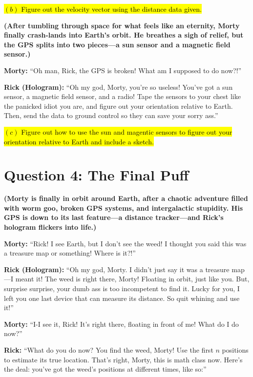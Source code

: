 \documentclass[a4paper, 12pt]{exam}
\begin{document}
\hl{$(b)$ Figure out the velocity vector using the distance data given.} \bigskip

\noindent \textbf{(After tumbling through space for what feels like an eternity, Morty finally crash-lands into Earth’s orbit. He breathes a sigh of relief, but the GPS splits into two pieces—a sun sensor and a magnetic field sensor.)} \bigskip

\noindent \textbf{Morty:} “Oh man, Rick, the GPS is broken! What am I supposed to do now?!” \bigskip

\noindent \textbf{Rick (Hologram):} “Oh my god, Morty, you’re so useless! You’ve got a sun sensor, a magnetic field sensor, and a radio! Tape the sensors to your chest like the panicked idiot you are, and figure out your orientation relative to Earth. Then, send the data to ground control so they can save your sorry ass.”

\bigskip

\hl{$(c)$ Figure out how to use the sun and magentic sensors to figure out your orientation relative to Earth and include a sketch.} \bigskip
	
	
	
\pagebreak
\section*{Question 4: The Final Puff}

\noindent \textbf{(Morty is finally in orbit around Earth, after a chaotic adventure filled with worm goo, broken GPS systems, and intergalactic stupidity. His GPS is down to its last feature—a distance tracker—and Rick’s hologram flickers into life.)}

\bigskip
\noindent \textbf{Morty:} “Rick! I see Earth, but I don’t see the weed! I thought you said this was a treasure map or something! Where is it?!” \bigskip

\noindent \textbf{Rick (Hologram):} “Oh my god, Morty. I didn’t just say it was a treasure map—I meant it! The weed is right there, Morty! Floating in orbit, just like you. But, surprise surprise, your dumb ass is too incompetent to find it. Lucky for you, I left you one last device that can measure its distance. So quit whining and use it!” \bigskip

\noindent \textbf{Morty:} “I-I see it, Rick! It’s right there, floating in front of me! What do I do now?” \bigskip

\noindent \textbf{Rick:} “What do you do now? You find the weed, Morty! Use the first \(n\) positions to estimate its true location. That’s right, Morty, this is math class now. Here’s the deal: you’ve got the weed’s positions at different times, like so:”
\end{document}
